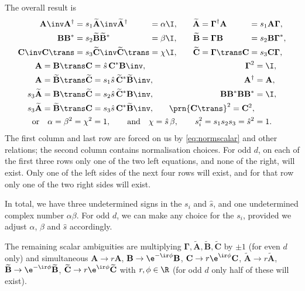 \documentclass[11pt]{article}
\newcommand{\Gammab}{\boldsymbol{\Gamma}}
\newcommand{\A}{\mathbf{A}}
\newcommand{\B}{\mathbf{B}}
\renewcommand{\C}{\mathbf{C}}
\newcommand{\At}{\widetilde{\A}}
\newcommand{\Bt}{\widetilde{\B}}
\newcommand{\Ct}{\widetilde{\C}}
\begin{document}
The overall result is
%
\begin{equation}\label{eq:constnorm}
\begin{gathered}
\begin{alignedat}{4}
  \A\inv \A^\dag &= s_1 \At\inv \At^\dag &
        &= \alpha \I, &
    \At &= \Gammab^\dag \A &
        &= s_1 \A \Gammab,
  \\
  \B \B^\ast &= s_2 \Bt \Bt^\ast &
        &= \beta \I, &
    \Bt &= \Gammab \B &
        &= s_2 \B \Gammab^\ast,
  \\
  \C\inv \C\trans &= s_3 \Ct\inv \Ct\trans &
        &= \chi \I, &\qquad
    \Ct &= \Gammab\trans \C &
        &= s_3 \C \Gammab,
  \\
\end{alignedat}
\\
\begin{alignedat}{3}
  \A &= \B\trans \C &
        &= \hat{s}\, \C^\ast \B\inv, &\qquad
    \Gammab^2 &= \I,
  \\
  \A &= \Bt\trans \Ct &
        &= s_1 \hat{s}\, \Ct^\ast \Bt\inv, &\qquad
    \A^\dag &= \A,
  \\
  s_3 \At &= \B\trans \Ct &
        &= s_2 \hat{s}\, \Ct^\ast \B\inv, &\qquad
    \B \B^\ast \B \B^\ast &= \I,
  \\
  s_3 \At &= \Bt\trans \C &
        &= s_3 \hat{s}\, \C^\ast \Bt\inv, &\qquad
    \prn{\C\trans}^2 = \C^2,
\end{alignedat}
\\
  \text{or}\quad
  \alpha = \beta^2 = \chi^2 = 1 , \qquad 
  \text{and} \quad
  \chi = \hat{s}\, \beta, \qquad
  s_i^2 = s_1 s_2 s_3 = \hat{s}^2 = 1.
\end{gathered}
\end{equation}
%
The first column and last row are forced on us by \cref{eq:normscalar} and other relations; the second column contains normalisation choices.
For odd $d$, on each of the first three rows only one of the two left equations, and none of the right, will exist.
Only one of the left sides of the next four rows will exist, and for that row only one of the two right sides will exist.

In total, we have three undetermined signs in the $s_i$ and $\hat{s}$, and one undetermined complex number $\alpha \beta$.
For odd $d$, we can make any choice for the $s_i$, provided we adjust $\alpha$, $\beta$ and $\hat{s}$ accordingly.

The remaining scalar ambiguities are multiplying $\Gammab,\At,\Bt,\Ct$ by $\pm1$ (for even $d$ only)
and simultaneous \( \A \rightarrow r \A \),
\( \B \rightarrow \e^{-\ir\phi} \B \), \( \C \rightarrow r\e^{\ir\phi} \C \),
\( \At \rightarrow r \At \), \( \Bt \rightarrow \e^{-\ir\phi} \Bt \),
\( \Ct \rightarrow r\e^{\ir\phi} \Ct \) with \( r, \phi \in \R \) (for odd $d$ only half of these will exist).
\end{document}
